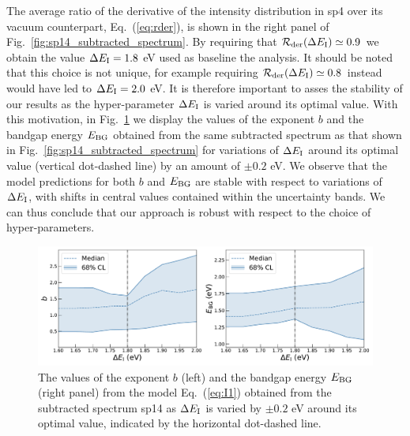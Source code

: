 The average ratio of the derivative of the intensity
distribution in sp4 over its vacuum counterpart, Eq.~(\ref{eq:rder}), is shown
in the right panel of  Fig.~\ref{fig:sp14_subtracted_spectrum}. 
%
By requiring that $\mathcal{R}_{\rm der}(\Delta E_{\rm I})\simeq 0.9$ we obtain
the value $\Delta E_{\rm I}=1.8$ eV used as baseline the analysis.
%
It should be noted that this choice is not unique, for example requiring
$\mathcal{R}_{\rm der}(\Delta E_{\rm I})\simeq 0.8$ instead would have led
to $\Delta E_{\rm I}=2.0$ eV.
%
It is therefore important to asses the stability of our results as the hyper-parameter $\Delta E_{\rm I}$
is varied around its optimal value.
%
With this motivation, in Fig.~\ref{fig:bvalues_sampleA} we display the
values of the exponent $b$
and the bandgap energy $E_{\rm BG}$ 
obtained from the same subtracted spectrum as that shown in
Fig.~\ref{fig:sp14_subtracted_spectrum} for variations of $\Delta E_{\rm I}$ 
around its optimal value (vertical dot-dashed line) by an amount
of $\pm 0.2$ eV.
%
We observe that the model predictions for both $b$ and $E_{\rm BG}$ are stable with respect
to variations of $\Delta E_{\rm I}$, with shifts in central values contained within the
uncertainty bands.
%
We can thus conclude that our approach is robust with respect to the choice of
hyper-parameters.

\begin{figure}[t]
\begin{centering}
  \includegraphics[width=0.99\linewidth]{plots/Stability_plots_sp14.pdf} 
  \caption{\small The values of the exponent $b$ (left)
    and the bandgap energy $E_{\rm BG}$ (right panel) from the model Eq.~(\ref{eq:I1})
    obtained from the subtracted spectrum sp14 as $\Delta E_{\rm I}$ is varied by $\pm 0.2$ eV
    around its optimal value, indicated by the horizontal dot-dashed line.
  }
\label{fig:bvalues_sampleA}
\end{centering}
\end{figure}


